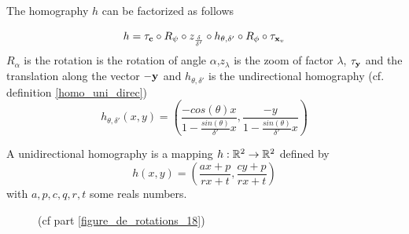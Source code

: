 \begin{prop}
The homography $h$ can be factorized as follows
 
\begin{equation}
h = \tau_{\mathbf{c}}   \circ R_{\psi} \circ z_{\frac{\delta}{\delta'}} \circ h_{\theta,\delta'} \circ R_{\phi} \circ \tau_{\mathbf{x}_v}
\label{formul_decomp}
\end{equation}
 $R_{\alpha}$ is the rotation is the rotation of angle $\alpha$,$z_\lambda$ is the zoom of factor $\lambda$, $\tau_{\mathbf{y}}$ and the translation along the vector $-\mathbf{y}$ and $h_{\theta,\delta'}$ is the undirectional homography (cf. definition \ref{homo_uni_direc})
\begin{equation}
h_{\theta,\delta'}(x,y)=\left(\frac{-cos(\theta)x}{1-\frac{sin(\theta)}{\delta'}x} ,\frac{-y}{1-\frac{sin(\theta)}{\delta'}x}\right)
\label{mise_perspective}
\end{equation}
\label{prop_decomp}
\end{prop}
\begin{Def}
A unidirectional homography is a mapping $h:\mathbb{R}^{2} \rightarrow \mathbb{R}^{2}$ defined by
\begin{equation*}
h(x,y)=\left ( \frac{ax+p}{rx+t} , \frac{cy+p}{rx+t} \right)
\end{equation*}
with $a,p,c,q,r,t$ some reals numbers.
\label{homo_uni_direc}
\end{Def}
\begin{figure}[h!]
\centering
{}
\caption{(cf part \ref{figure_de_rotations_18})}
\label{img_angles}
\end{figure}

